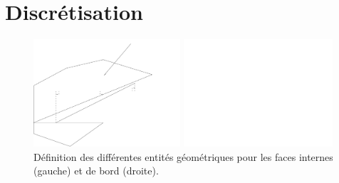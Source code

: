 %
% 
%
% 
% 
% 
%
%

\section{Discr\'etisation}

\begin{figure}[h]
\parbox{8cm}{%
\centerline{\includegraphics[height=4cm]{../Base/Gradmc/Images/facette.pdf}}}
\parbox{8cm}{%
\centerline{\includegraphics[height=4cm]{../Base/Gradmc/Images/facebord.pdf}}}
\caption{\label{Base_Gradmc_fig_geom_gradmc}D\'efinition des diff\'erentes entit\'es
g\'eom\'etriques pour les faces internes (gauche) et de bord (droite).}
\end{figure}

